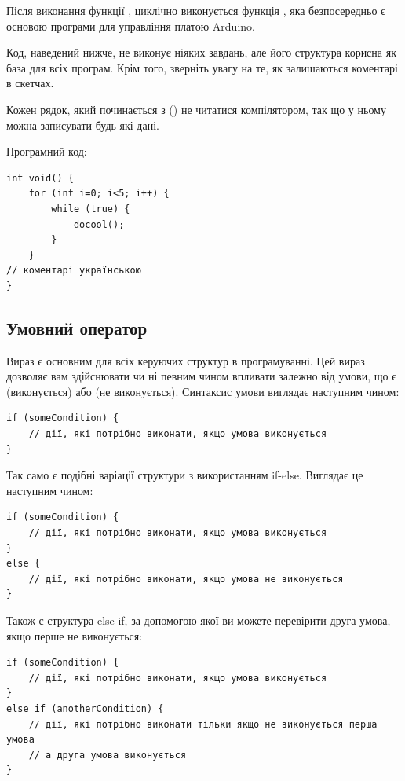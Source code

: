 \documentclass[12pt,a4paper]{book}  %
\begin{document}
Після виконання функції , циклічно виконується функція , яка безпосередньо є основою програми для управління платою Arduino.

Код, наведений нижче, не виконує ніяких завдань, але його структура корисна як база для всіх програм. Крім того, зверніть увагу на те, як залишаються коментарі в скетчах.

Кожен рядок, який починається з (\code{//}) не читатися компілятором, так що у ньому можна записувати будь-які дані.


\newpage

Програмний код:

\begin{lstlisting}[label=some-code,caption=Структура програми]
int void() {
	for (int i=0; i<5; i++) {
		while (true) {
			docool();		
		}	
	}
// коментарі українською
}
\end{lstlisting}	

\subsection{Умовний оператор}

Вираз  є основним для всіх керуючих структур в програмуванні. Цей вираз дозволяє вам здійснювати чи ні певним чином впливати залежно від умови, що є  (виконується) або  (не виконується). Синтаксис умови  виглядає наступним чином:

\begin{lstlisting}[label=conditionoperator,caption=Умовний оператор (неповна форма)]
if (someCondition) {
	// дії, які потрібно виконати, якщо умова виконується
}
\end{lstlisting}

Так само є подібні варіації структури з використанням if-else. Виглядає це наступним чином:

\begin{lstlisting}[label=conditionoperator,caption=Умовний оператор (повна форма)]
if (someCondition) {
	// дії, які потрібно виконати, якщо умова виконується
}
else {
	// дії, які потрібно виконати, якщо умова не виконується
}
\end{lstlisting}

Також є структура else-if, за допомогою якої ви можете перевірити друга умова, якщо перше не виконується:

\begin{lstlisting}[label=conditionoperator,caption=Умовний оператор (декільки умов)]
if (someCondition) {
	// дії, які потрібно виконати, якщо умова виконується
} 
else if (anotherCondition) {
	// дії, які потрібно виконати тільки якщо не виконується перша умова
	// а друга умова виконується
}
\end{lstlisting}
\end{document}
